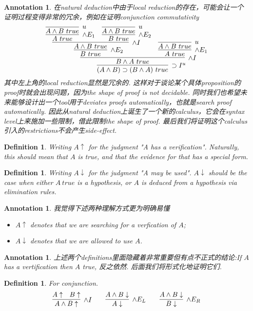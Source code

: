 \documentclass{article}
\theoremstyle{plain}
\newtheorem{definition}[theorem]{Definition}
\newtheorem{annotation}[theorem]{Annotation}
\theoremstyle{nonumberplain}
\begin{document}
\begin{annotation}
\rm \cite{15-317-vu} 在natural deduction中由于local reduction的存在，可能会让一个证明过程变得非常的冗余，例如在证明conjunction commutativity
$$
\infer[\supset I^u]{(A \wedge B) \supset (B \wedge A)~true}{\infer[\wedge I]{B \wedge A~true}{\infer[\wedge E_2]{B~true}{\infer[\wedge I]{A \wedge B~true}{\infer[\wedge E_1]{A~true}{\infer[u]{A \wedge B ~true}{}}  &  \infer[\wedge E_2]{B~true}{\infer[u]{A \wedge B ~true}{}}}}  &  \infer[\wedge E_1]{A~true}{\infer[u]{A \wedge B ~true}{}}}}
$$
其中左上角的local reduction显然是冗余的. 这样对于谈论某个具体proposition的proof时就会出现问题，因为the shape of proof is not decidable. 同时我们也希望未来能够设计出一个tool用于deviates proofs automatically，也就是search proof automatically. 因此从natural deduction上诞生了一个新的calculus，它会在syntax level上来施加一些限制，借此限制the shape of proof. 最后我们将证明这个calculus引入的restrictions不会产生side-effect.   
\end{annotation}


\begin{definition}
\rm Writing $A\uparrow$ for the judgment "A has a verification". Naturally, this should mean that $A$ is true,  and that the evidence for that has a special form.
\end{definition}

\begin{definition}
\rm Writing $A\downarrow$ for the judgment "A may be used". $A\downarrow$ should be the case when either $A~true$ is a hypothesis, or $A$ is deduced from a hypothesis via elimination rules. 
\end{definition}

\begin{annotation}
\rm 我觉得下述两种理解方式更为明确易懂
\begin{itemize}
	\item $A \uparrow$ denotes that we are searching for a verfication of $A$;
	\item $A  \downarrow$ denotes that we are allowed to use $A$. 
\end{itemize}
\end{annotation}

\begin{annotation}
\rm 上述两个definitions里面隐藏着非常重要但有点不正式的结论:If $A$ has a vertification then $A$ true, 反之依然. 后面我们将形式化地证明它们. 
\end{annotation}

\begin{definition}
\rm For conjunction. 
$$
\begin{aligned}
&\infer[\wedge I]{A \wedge B\uparrow}{A \uparrow & B \uparrow} &&& \infer[\wedge E_L]{A \downarrow}{A \wedge B \downarrow} &&&& \infer[\wedge E_R]{B \downarrow}{A \wedge B \downarrow}
\end{aligned}
$$
\end{definition}
\end{document}
